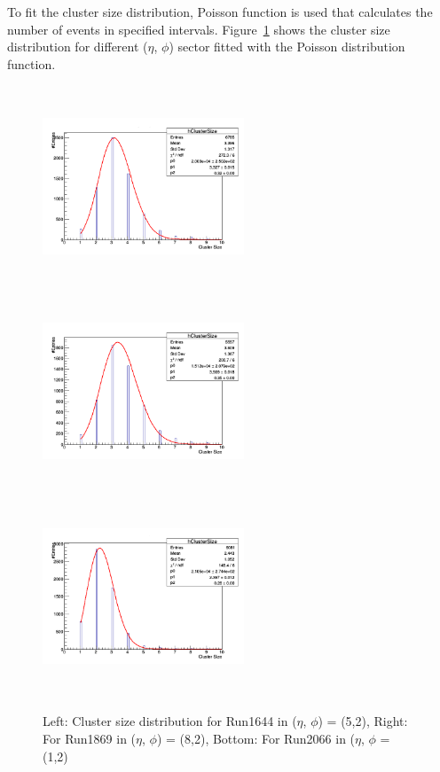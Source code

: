 To fit the cluster size distribution, Poisson function is used that calculates the number of events in specified intervals. Figure~\ref{fig:CSDpoissonfunction} shows the cluster size distribution for different ($\eta$, $\phi$) sector fitted with the Poisson distribution function.
  \begin{figure}[!htbp]
    \begin{center}
      \includegraphics[width=6cm,height=6cm]{figures/GEM/Run1644.png}
      \includegraphics[width=6cm,height=6cm]{figures/GEM/Run1869.png}
      \includegraphics[width=6cm,height=6cm]{figures/GEM/Run2066.png}
    \end{center}
    \caption{Left: Cluster size distribution for Run1644 in ($\eta$, $\phi$) = (5,2), Right: For Run1869 in ($\eta$, $\phi$) = (8,2), Bottom: For Run2066 in ($\eta$, $\phi$ = (1,2)}
    \label{fig:CSDpoissonfunction}
  \end{figure}
